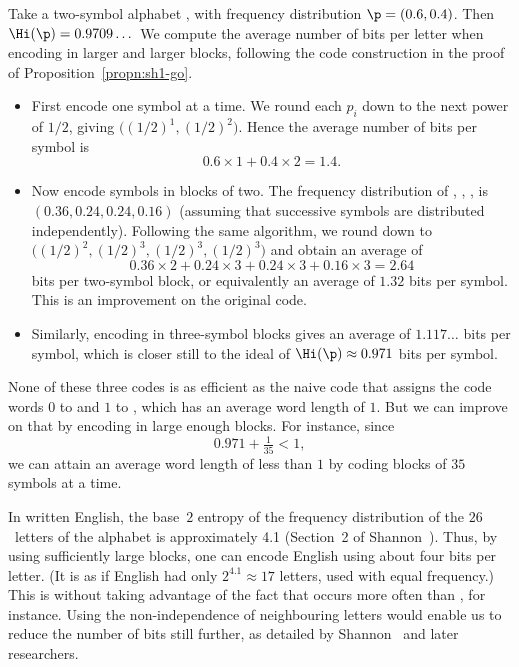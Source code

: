 \begin{example}
Take a two-symbol alphabet ,  with frequency distribution $\p =
(0.6, 0.4)$.  Then $\Hi(\p) = 0.9709\ldots$\:\  We compute the average number
of bits per letter when encoding in larger and larger blocks, following the
code construction in the proof of Proposition~\ref{propn:sh1-go}.
% 
\begin{itemize}
\item 
First encode one symbol at a time.  We round each $p_i$ down to the next
power of $1/2$, giving $\bigl((1/2)^1,
(1/2)^2\bigr)$.  Hence the average number of bits per symbol is
\[
0.6 \times 1 + 0.4 \times 2 = 1.4.
\]

\item
Now encode symbols in blocks of two.  The frequency distribution of
, , ,  is $(0.36, 0.24, 0.24, 0.16)$ (assuming
that successive symbols are distributed independently).  Following the same
algorithm, we round down to $\bigl((1/2)^2, (1/2)^3,
(1/2)^3, (1/2)^3\bigr)$ and obtain an average of
\[
0.36 \times 2 + 0.24 \times 3 + 0.24 \times 3 + 0.16 \times 3
=
2.64
\]
bits per two-symbol block, or equivalently an average of $1.32$ bits per
symbol.  This is an improvement on the original code.

\item
Similarly, encoding in three-symbol blocks gives an average of
$1.117\ldots$ bits per symbol, which is closer still to the
ideal of $\Hi(\p) \approx 0.971$ bits per symbol.
\end{itemize}
% 
None of these three codes is as efficient as the naive code that assigns
the code words $0$ to  and $1$ to , which has an average word
length of $1$.  But we can improve on that by encoding in large enough
blocks.  For instance, since
\[
0.971 + \tfrac{1}{35} < 1,
\]
we can attain an average word length of less than $1$ by coding blocks of
$35$ symbols at a time.
\end{example}

\begin{example}
% 
In written English, the base~$2$ entropy of the frequency distribution of
the $26$~letters of the alphabet is approximately 4.1 (Section~2 of
Shannon~\cite{ShanPEP}).  Thus, by using sufficiently large blocks, one can
encode English using about four bits per letter.  (It is as if English had
only $2^{4.1} \approx 17$ letters, used with equal frequency.)  This is
without taking advantage of the fact that  occurs more often than
, for instance.  Using the non-independence of neighbouring letters
would enable us to reduce the number of bits still further, as detailed by
Shannon~\cite{ShanPEP} and later researchers.
\end{example}

